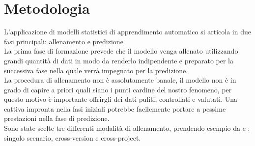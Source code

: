 \documentclass[%
    corpo=12pt,
    twoside,
    oldstyle,
    autoretitolo,
    greek,
    evenboxes,
]{toptesi}
\begin{document}
\section{Metodologia}
L'applicazione di modelli statistici di apprendimento automatico si articola in due fasi principali: allenamento e predizione.\\
La prima fase di formazione prevede che il modello venga allenato utilizzando grandi quantità di dati in modo da renderlo indipendente e preparato per la successiva fase nella quale verrà impegnato per la predizione.\\
La procedura di allenamento non è assolutamente banale, il modello non è in grado di capire a priori quali siano i punti cardine del nostro fenomeno, per questo motivo è importante offrirgli dei dati puliti, controllati e valutati. Una cattiva impronta nella fasi iniziali potrebbe facilemente portare a pessime prestazioni nella fase di predizione.\\
Sono state scelte tre differenti modalità di allenamento, prendendo esempio da \cite{Chen} e \cite{super_unsuper}: singolo scenario, cross-version e cross-project.
\end{document}
